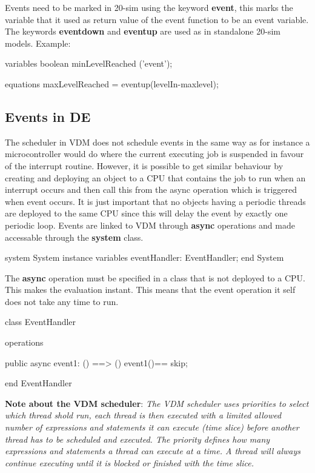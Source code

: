 \documentclass{crescendorepchap}
\newcommand{\vdmkeyw}[1]{{\bf\ttfamily #1}}
\begin{document}
Events need to be marked in 20-sim using the keyword \vdmkeyw{event}, this marks the
variable that it used as return value of the event function to be an
event variable. The keywords \vdmkeyw{eventdown} and \vdmkeyw{eventup} are used as in
standalone 20-sim models. Example:

\begin{dcl}
variables
  boolean minLevelReached ('event');

equations
  maxLevelReached = eventup(levelIn-maxlevel);
\end{dcl}

\subsection{Events in DE}

The scheduler in VDM does not schedule events in the same way as for
instance a microcontroller would do where the current executing job is
suspended in favour of the interrupt routine. However, it is possible to
get similar behaviour by creating and deploying an object to a CPU
that contains the job to run when an interrupt occurs and then call this
from the async operation which is triggered when event occurs. It is
just important that no objects having a periodic threads are deployed to
the same CPU since this will delay the event by exactly one periodic
loop. Events are linked to VDM through \vdmkeyw{async} operations and
made accessable through the \vdmkeyw{system} class.

\begin{vdmrt}
system System
instance variables
  eventHandler: EventHandler;
end System
\end{vdmrt}

The \vdmkeyw{async} operation must be specified in a class that is not deployed to
a CPU. This makes the evaluation instant. This means that the event
operation it self does not take any time to run.

\begin{vdmrt}
class EventHandler

operations

public async event1: () ==> ()
event1()== skip;

end EventHandler
\end{vdmrt}

\textbf{Note about the VDM scheduler}: \emph{The VDM scheduler uses
priorities to select which thread shold run, each thread is then
executed with a limited allowed number of expressions and statements it can
execute (time slice) before another thread has to be scheduled and executed. The
priority defines how many expressions and statements a thread can execute
at a time. A thread will always continue executing until it is blocked
or finished with the time slice.}
\end{document}
